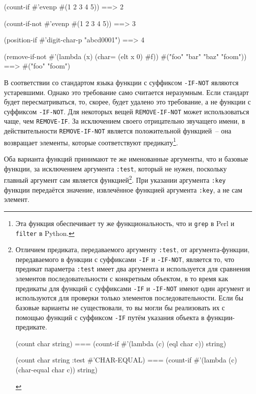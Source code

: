 \begin{myverb}
(count-if #'evenp #(1 2 3 4 5))         ==> 2

(count-if-not #'evenp #(1 2 3 4 5))     ==> 3

(position-if #'digit-char-p "abcd0001") ==> 4

(remove-if-not #'(lambda (x) (char= (elt x 0) #\bslash{}f))
  #("foo" "bar" "baz" "foom")) ==> #("foo" "foom")
\end{myverb}

В соответствии со стандартом языка функции с суффиксом \lstinline{-IF-NOT} являются
устаревшими.  Однако это требование само считается неразумным.  Если стандарт будет
пересматриваться, то, скорее, будет удалено это требование, а не функции с суффиксом
\lstinline{-IF-NOT}.  Для некоторых вещей \lstinline{REMOVE-IF-NOT} может использоваться чаще, чем
\lstinline{REMOVE-IF}.  За исключением своего отрицательно звучащего имени, в действительности
\lstinline{REMOVE-IF-NOT} является положительной функцией~-- она возвращает элементы, которые
соответствуют предикату\footnote{Эта функция обеспечивает ту же функциональность, что и
  \lstinline{grep} в Perl и \lstinline{filter} в Python.}.

Оба варианта функций принимают те же именованные аргументы, что и базовые функции, за
исключением аргумента \lstinline{:test}, который не нужен, поскольку главный аргумент сам
является функцией\footnote{Отличием предиката, передаваемого аргументу \lstinline{:test}, от
  аргумента-функции, передаваемого в функции с суффиксами \lstinline{-IF} и \lstinline{-IF-NOT},
  является то, что предикат параметра \lstinline{:test} имеет два аргумента и используется для
  сравнения элементов последовательности с конкретным объектом, в то время как предикаты
  для функций с суффиксами \lstinline{-IF} и \lstinline{-IF-NOT} имеют один аргумент и используются
  для проверки только элементов последовательности.  Если бы базовые варианты не
  существовали, то вы могли бы реализовать их с помощью функций с суффиксом \lstinline{-IF}
  путём указания объекта в функции-предикате.

\begin{myverb}
(count char string) ===
  (count-if #'(lambda (c) (eql char c)) string)

(count char string :test #'CHAR-EQUAL) ===
  (count-if #'(lambda (c) (char-equal char c)) string)
\end{myverb}

}.  При указании аргумента \lstinline{:key} функции передаётся значение, извлечённое функцией
аргумента \lstinline{:key}, а не сам элемент.


